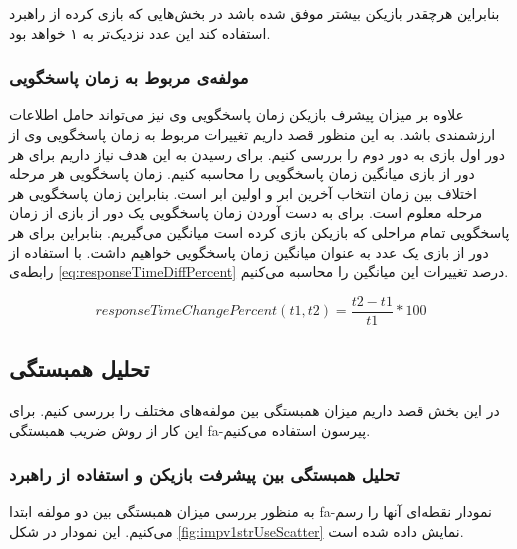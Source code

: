 \documentclass[twoside, a4paper,11pt]{book}
\numberwithin{equation}{chapter}
\numberwithin{table}{chapter}
\numberwithin{figure}{chapter}
\numberwithin{equation}{chapter}
\newcommand{\mls}[1]{\gls{fa-#1}\glsuseri{la-#1}}
\begin{document}
بنابراین هرچقدر بازیکن بیشتر موفق شده باشد در بخش‌هایی که بازی کرده از راهبرد استفاده کند این عدد نزدیک‌تر به ۱ خواهد بود.

\subsubsection{مولفه‌ی مربوط به زمان پاسخگویی}
علاوه بر میزان پیشرف بازیکن زمان پاسخگویی وی نیز می‌تواند حامل اطلاعات ارزشمندی باشد. به این منظور قصد داریم تغییرات مربوط به زمان پاسخگویی وی از دور اول بازی به دور دوم را بررسی کنیم. برای رسیدن به این هدف نیاز داریم برای هر دور از بازی میانگین زمان پاسخگویی را محاسبه کنیم. زمان پاسخگویی هر مرحله اختلاف بین زمان انتخاب آخرین ابر و اولین ابر است. بنابراین زمان پاسخگویی هر مرحله معلوم است. برای به دست آوردن زمان پاسخگویی یک دور از بازی از زمان پاسخگویی تمام مراحلی که بازیکن بازی کرده است میانگین می‌گیریم. بنابراین برای هر دور از بازی یک عدد به عنوان میانگین زمان پاسخگویی خواهیم داشت. با استفاده از رابطه‌ی \ref{eq:responseTimeDiffPercent} درصد تغییرات این میانگین را محاسبه می‌کنیم.

\begin{equation}
\label{eq:responseTimeDiffPercent}
	responseTimeChangePercent(t1, t2) = \frac{t2 - t1}{t1}*100
\end{equation}

\subsection{تحلیل همبستگی}
در این بخش قصد داریم میزان همبستگی بین مولفه‌های مختلف را بررسی کنیم. برای این کار از روش ضریب همبستگی  \mls{پیرسون} استفاده می‌کنیم.
\subsubsection{تحلیل همبستگی بین پیشرفت بازیکن و استفاده از راهبرد}

به منظور بررسی میزان همبستگی بین دو مولفه ابتدا \mls{نمودار نقطه‌ای} آنها را رسم می‌کنیم. این نمودار در شکل \ref{fig:impv1strUseScatter} نمایش داده شده است.
\end{document}
